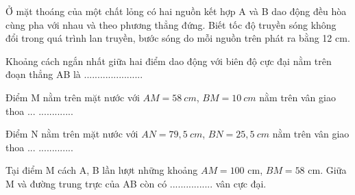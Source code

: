 \begin{vidu}
Ở mặt thoáng của một chất lỏng có hai nguồn kết hợp A và B dao động đều hòa cùng pha với nhau và theo phương thẳng đứng. Biết tốc độ truyền sóng không đổi trong quá trình lan truyền, bước sóng do mỗi nguồn trên phát ra bằng 12 cm. 
\item[1.] Khoảng cách ngắn nhất giữa hai điểm dao động với biên độ cực đại nằm trên đoạn thẳng AB là ......................
\item[2.] Điểm M nằm trên mặt nước với $AM = 58\ cm$, $BM = 10\ cm$ nằm trên vân giao thoa ... ............. 
\item[3.] Điểm N nằm trên mặt nước với $AN = 79,5\ cm$, $BN = 25,5\ cm$ nằm trên vân giao thoa ... ............. 
\item[4.] Tại điểm M cách A, B lần lượt những khoảng $AM=100$ cm, $BM=58$ cm. Giữa M và đường trung trực của AB còn có ................ vân cực đại.
\end{vidu} 

